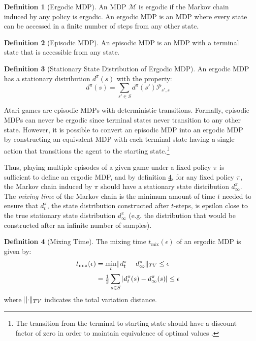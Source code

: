 \documentclass{article} %
\DeclarePairedDelimiter{\norm}{\lVert}{\rVert}
\theoremstyle{definition}
\newtheorem{definition}{Definition}[section]
\begin{document}
\begin{definition}[Ergodic MDP]
An MDP $\mathcal{M}$ is ergodic if the Markov chain induced by any
policy is ergodic. An ergodic MDP is an MDP where every state can be
accessed in a finite number of steps from any other state.
\end{definition}

\begin{definition}[Episodic MDP]
An episodic MDP is an MDP with a terminal state that is accessible
from any state.
\end{definition}

\begin{definition}[Stationary State Distribution of Ergodic MDP]
\label{def:ssd}
An ergodic MDP has a stationary distribution $d^{\pi}(s)$ with the property:
\[
d^\pi(s) = \sum_{s' \in S} d^\pi(s')\mathcal{P}_{s',s}
\]
\end{definition}

Atari games are episodic MDPs with deterministic transitions. Formally,
episodic MDPs can never be ergodic since terminal states never
transition to any other state. However, it is possible to convert an
episodic MDP into an ergodic MDP by constructing an equivalent MDP
with each terminal state having a single action that transitions the
agent to the starting state.\footnote{The transition from the terminal to
starting state should have a discount factor of zero in order to
maintain equivalence of optimal values \cite{VanHasselt11}.}

Thus, playing multiple episodes of a given game under a fixed policy
$\pi$ is sufficient to define an ergodic MDP, and by definition
\ref{def:ssd}, for any fixed policy $\pi$, the Markov chain induced by
$\pi$ should have a stationary state distribution $d^\pi_\infty$. The
\textit{mixing time} of the Markov chain is the minimum amount of time
$t$ needed to ensure that $d^\pi_t$, the state distribution
constructed after $t$-steps, is epsilon close to the true stationary
state distribution $d^\pi_\infty$ (e.g. the distribution that would be
constructed after an infinite number of samples).

\begin{definition}[Mixing Time]
\label{def:ssd}
The mixing time $t_{\mathrm{mix}}(\epsilon)$ of an ergodic MDP is given by:
\begin{align*}
t_{\mathrm{mix}}(\epsilon) & = \min_t \norm{d^\pi_t - d^\pi_\infty}_{TV} \le \epsilon \\
& = \tfrac{1}{2}\sum_{s \in S} |d^\pi_t(s) - d^\pi_\infty(s) | \le \epsilon
\end{align*}
where $\norm{\cdot}_{TV}$ indicates the total variation distance.
\end{definition}
\end{document}
